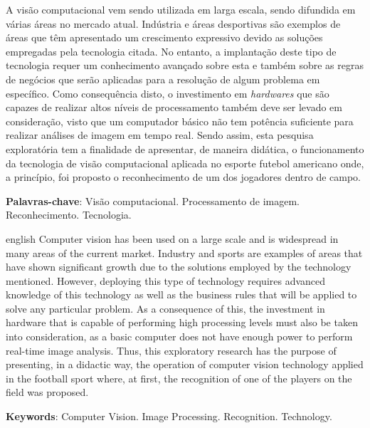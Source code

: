 \begin{resumo}[RESUMO]
A visão computacional vem sendo utilizada em larga escala, sendo difundida em várias áreas no mercado atual. Indústria e áreas desportivas são exemplos de áreas que têm apresentado um crescimento expressivo devido as soluções empregadas pela tecnologia citada. No entanto, a implantação deste tipo de tecnologia requer um conhecimento avançado sobre esta e também sobre as regras de negócios que serão aplicadas para a resolução de algum problema em específico. Como consequência disto, o investimento em \textit{hardwares} que são capazes de realizar altos níveis de processamento também deve ser levado em consideração, visto que um computador básico não tem potência suficiente para realizar análises de imagem em tempo real. Sendo assim, esta pesquisa exploratória tem a finalidade de apresentar, de maneira didática, o funcionamento da tecnologia de visão computacional aplicada no esporte futebol americano onde, a princípio, foi proposto o reconhecimento de um dos jogadores dentro de campo.

 \textbf{Palavras-chave}: Visão computacional. Processamento de imagem. Reconhecimento. Tecnologia.
\end{resumo}

\begin{resumo}[ABSTRACT]
 \begin{otherlanguage*}{english}
Computer vision has been used on a large scale and is widespread in many areas of the current market. Industry and sports are examples of areas that have shown significant growth due to the solutions employed by the technology mentioned. However, deploying this type of technology requires advanced knowledge of this technology as well as the business rules that will be applied to solve any particular problem. As a consequence of this, the investment in hardware that is capable of performing high processing levels must also be taken into consideration, as a basic computer does not have enough power to perform real-time image analysis. Thus, this exploratory research has the purpose of presenting, in a didactic way, the operation of computer vision technology applied in the football sport where, at first, the recognition of one of the players on the field was proposed.

   \noindent 
   \textbf{Keywords}: Computer Vision. Image Processing. Recognition. Technology.
 \end{otherlanguage*}
\end{resumo}